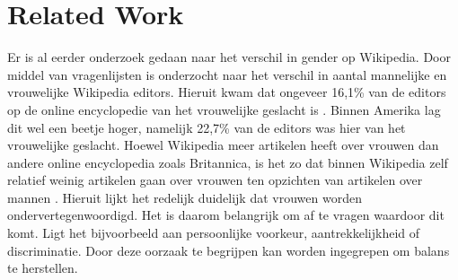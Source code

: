 \section{Related Work}
\label{sec:rel}

Er is al eerder onderzoek gedaan naar het verschil in gender op Wikipedia. Door middel van vragenlijsten is onderzocht naar het verschil  in aantal mannelijke en vrouwelijke Wikipedia editors. Hieruit kwam dat ongeveer 16,1\% van de editors op de online encyclopedie van het vrouwelijke geslacht is \citep{hill2013wikipedia}. Binnen Amerika lag dit wel een beetje hoger, namelijk 22,7\% van de editors was hier van het vrouwelijke geslacht. Hoewel Wikipedia meer artikelen heeft over vrouwen dan andere online encyclopedia zoals Britannica, is het zo dat binnen Wikipedia zelf relatief weinig artikelen gaan over vrouwen ten opzichten van artikelen over mannen \citep{reagle2011gender}. Hieruit lijkt het redelijk duidelijk dat vrouwen worden ondervertegenwoordigd. Het is daarom belangrijk om af te vragen waardoor dit komt. Ligt het bijvoorbeeld aan persoonlijke voorkeur, aantrekkelijkheid of discriminatie. Door deze oorzaak te begrijpen kan worden ingegrepen om balans te herstellen. 




